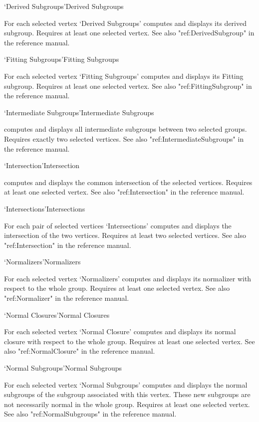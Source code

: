 \>`Derived Subgroups'{Derived Subgroups}

For each selected vertex `Derived Subgroups' computes and displays its
derived subgroup.  Requires at least one selected vertex.  See also
"ref:DerivedSubgroup" in the {\GAP}
reference manual.

\>`Fitting Subgroups'{Fitting Subgroups}

For each selected vertex `Fitting Subgroups' computes and displays its
Fitting subgroup.  Requires at least one selected vertex.  See also
"ref:FittingSubgroup" in the {\GAP}
reference manual.

\>`Intermediate Subgroups'{Intermediate Subgroups}

computes and displays all intermediate subgroups between two selected
groups. Requires exactly two selected vertices. See also
"ref:IntermediateSubgroups" in the {\GAP}
reference manual. 

\>`Intersection'{Intersection}

computes and displays the common intersection of the selected vertices.
Requires at least one selected vertex.  See also "ref:Intersection" in the
{\GAP} reference manual.

\>`Intersections'{Intersections}

For each pair of selected vertices `Intersections' computes and displays
the intersection of the two vertices.  Requires at least two selected
vertices.  See also "ref:Intersection" in the {\GAP}
reference manual.

\>`Normalizers'{Normalizers}

For each selected vertex `Normalizers' computes and displays its normalizer
with respect to the whole group.  Requires at least one selected vertex.
See also "ref:Normalizer" in the {\GAP}
reference manual.

\>`Normal Closures'{Normal Closures}

For each selected vertex `Normal Closure' computes and displays its normal
closure with respect to the whole group.  Requires at least one selected
vertex.  See also "ref:NormalClosure" in the {\GAP}
reference manual.

\>`Normal Subgroups'{Normal Subgroups}

For   each selected vertex `Normal  Subgroups'  computes and displays the
normal subgroups of the subgroup associated  with this vertex.  These new
subgroups are not  necessarily  normal in the  whole  group.  Requires at
least one selected vertex.  See also "ref:NormalSubgroups" in the {\GAP}
reference manual.

